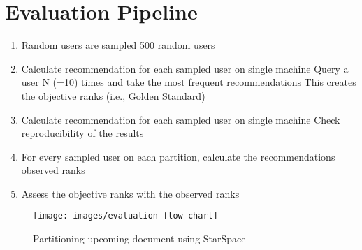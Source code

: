\section{Evaluation Pipeline}
\label{sec:evaluation-pipeline}

\begin{enumerate}
    \item Random users are sampled
    500 random users 
    
    \item Calculate recommendation for each sampled user on single machine
    Query a user N (=10) times and  take the most frequent recommendations
    This creates the objective ranks (i.e., Golden Standard)
    
    \item Calculate recommendation for each sampled user on single machine
    Check reproducibility of the results
    
    \item For every sampled user on each partition, calculate the recommendations
    observed ranks
    
    \item Assess the objective ranks with the observed ranks
    
\end{enumerate}

\begin{figure}[!h]
	\centering
	\texttt{[image: images/evaluation-flow-chart]}
	\caption{Partitioning upcoming document using StarSpace}
	\label{fig:partitioning-star-space}
\end{figure}